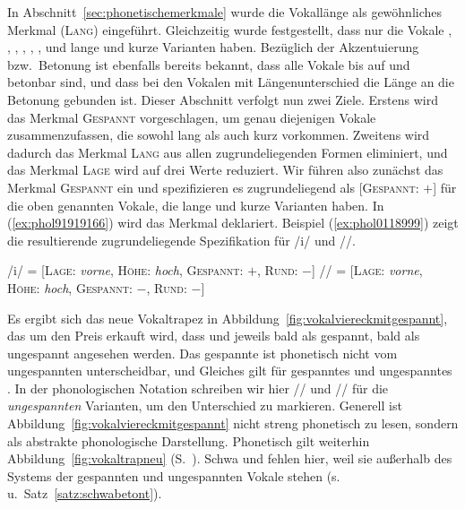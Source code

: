 In Abschnitt~\ref{sec:phonetischemerkmale} wurde die Vokallänge als gewöhnliches Merkmal (\textsc{Lang}) eingeführt.
Gleichzeitig wurde festgestellt, dass nur die Vokale \textipa{[i]}, \textipa{[y]}, \textipa{[u]}, \textipa{[e]}, \textipa{[\o]}, \textipa{[E]}, \textipa{[o]} und \textipa{[a]} lange und kurze Varianten haben.
Bezüglich der Akzentuierung bzw.\ Betonung ist ebenfalls bereits bekannt, dass alle Vokale bis auf \textipa{[@]} und \textipa{[5]} betonbar sind, und dass bei den Vokalen mit Längenunterschied die Länge an die Betonung gebunden ist.
Dieser Abschnitt verfolgt nun zwei Ziele.
Erstens wird das Merkmal \textsc{Gespannt} vorgeschlagen, um genau diejenigen Vokale zusammenzufassen, die sowohl lang als auch kurz vorkommen.
Zweitens wird dadurch das Merkmal \textsc{Lang} aus allen zugrundeliegenden Formen eliminiert, und das Merkmal \textsc{Lage} wird auf drei Werte reduziert.
Wir führen also zunächst das Merkmal \textsc{Gespannt} ein und spezifizieren es zugrundeliegend als [\textsc{Gespannt}: $+$] für die oben genannten Vokale, die lange und kurze Varianten haben.
In (\ref{ex:phol91919166}) wird das Merkmal deklariert.
Beispiel (\ref{ex:phol0118999}) zeigt die resultierende zugrundeliegende Spezifikation für /i/ und //.

\begin{exe}
  \ex\label{ex:phol0118999}
  \begin{xlist}
    \ex /i/ = [\textsc{Lage}: \textit{vorne}, \textsc{Höhe}: \textit{hoch}, \textsc{Gespannt}: $+$, \textsc{Rund}: $-$]
    \ex // = [\textsc{Lage}: \textit{vorne}, \textsc{Höhe}: \textit{hoch}, \textsc{Gespannt}: $-$, \textsc{Rund}: $-$]
  \end{xlist}
\end{exe}

Es ergibt sich das neue Vokaltrapez in Abbildung~\ref{fig:vokalviereckmitgespannt}, das um den Preis erkauft wird, dass \textipa{[E]} und \textipa{[a]} jeweils bald als gespannt, bald als ungespannt angesehen werden.
Das gespannte \textipa{[a]} ist phonetisch nicht vom ungespannten \textipa{[a]} unterscheidbar, und Gleiches gilt für gespanntes und ungespanntes \textipa{[E]}.
In der phonologischen Notation schreiben wir hier // und // für die \textit{ungespannten} Varianten, um den Unterschied zu markieren.
Generell ist Abbildung~\ref{fig:vokalviereckmitgespannt} nicht streng phonetisch zu lesen, sondern als abstrakte phonologische Darstellung.
Phonetisch gilt weiterhin Abbildung~\ref{fig:vokaltrapneu} (S.~\pageref{fig:vokaltrapneu}).
Schwa und \textipa{[5]} fehlen hier, weil sie außerhalb des Systems der gespannten und ungespannten Vokale stehen (s.\,u.\ Satz~\ref{satz:schwabetont}).

